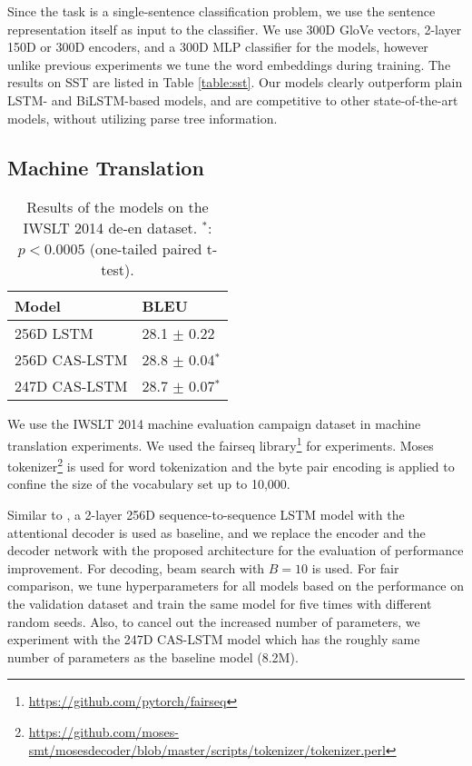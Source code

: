\documentclass[wcp]{jmlr}
\begin{document}
    Since the task is a single-sentence classification problem, we use the sentence representation itself as input to the classifier.
    We use 300D GloVe vectors, 2-layer 150D or 300D encoders, and a 300D MLP classifier for the models,
    however unlike previous experiments we tune the word embeddings during training.
    The results on SST are listed in Table \ref{table:sst}.
    Our models clearly outperform plain LSTM- and BiLSTM-based models, and are competitive to other state-of-the-art models, without utilizing parse tree information.
    
    \subsection{Machine Translation}
    \begin{table}[tb]
        \centering
        \begin{tabular}{l l}
            \hline
            \bf{Model} & \bf{BLEU} \\
            \hline
            256D LSTM & 28.1 $\pm$ 0.22 \\
            256D CAS-LSTM & 28.8 $\pm$ 0.04$^\ast$ \\
            247D CAS-LSTM & 28.7 $\pm$ 0.07$^\ast$ \\
            \hline
        \end{tabular}
        \caption{
            Results of the models on the IWSLT 2014 de-en dataset.
            $^\ast$: $p < 0.0005$ (one-tailed paired t-test).
        }
        \label{table:mt}
    \end{table}
    We use the IWSLT 2014 machine evaluation campaign dataset \citep{cettolo2014report} in machine translation experiments.
    We used the fairseq library\footnote{\url{https://github.com/pytorch/fairseq}} \citep{gehring2017fairseq} for experiments.
    Moses tokenizer\footnote{\url{https://github.com/moses-smt/mosesdecoder/blob/master/scripts/tokenizer/tokenizer.perl}} is used for word tokenization and the byte pair encoding \citep{sennrich2016bpe} is applied to confine the size of the vocabulary set up to 10,000.
    
    Similar to \citet{wiseman2016nmt}, a 2-layer 256D sequence-to-sequence LSTM model with the attentional decoder is used as baseline, and we replace the encoder and the decoder network with the proposed architecture for the evaluation of performance improvement.
    For decoding, beam search with $B=10$ is used.
    For fair comparison, we tune hyperparameters for all models based on the performance on the validation dataset and train the same model for five times with different random seeds.
    Also, to cancel out the increased number of parameters, we experiment with the 247D CAS-LSTM model which has the roughly same number of parameters as the baseline model (8.2M).
    
\end{document}
